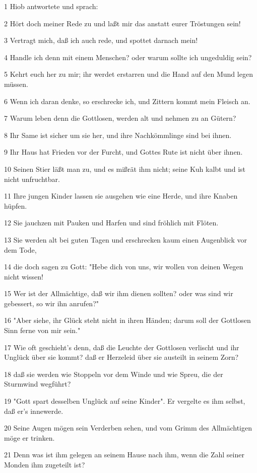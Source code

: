 \par 1 Hiob antwortete und sprach:
\par 2 Hört doch meiner Rede zu und laßt mir das anstatt eurer Tröstungen sein!
\par 3 Vertragt mich, daß ich auch rede, und spottet darnach mein!
\par 4 Handle ich denn mit einem Menschen? oder warum sollte ich ungeduldig sein?
\par 5 Kehrt euch her zu mir; ihr werdet erstarren und die Hand auf den Mund legen müssen.
\par 6 Wenn ich daran denke, so erschrecke ich, und Zittern kommt mein Fleisch an.
\par 7 Warum leben denn die Gottlosen, werden alt und nehmen zu an Gütern?
\par 8 Ihr Same ist sicher um sie her, und ihre Nachkömmlinge sind bei ihnen.
\par 9 Ihr Haus hat Frieden vor der Furcht, und Gottes Rute ist nicht über ihnen.
\par 10 Seinen Stier läßt man zu, und es mißrät ihm nicht; seine Kuh kalbt und ist nicht unfruchtbar.
\par 11 Ihre jungen Kinder lassen sie ausgehen wie eine Herde, und ihre Knaben hüpfen.
\par 12 Sie jauchzen mit Pauken und Harfen und sind fröhlich mit Flöten.
\par 13 Sie werden alt bei guten Tagen und erschrecken kaum einen Augenblick vor dem Tode,
\par 14 die doch sagen zu Gott: "Hebe dich von uns, wir wollen von deinen Wegen nicht wissen!
\par 15 Wer ist der Allmächtige, daß wir ihm dienen sollten? oder was sind wir gebessert, so wir ihn anrufen?"
\par 16 "Aber siehe, ihr Glück steht nicht in ihren Händen; darum soll der Gottlosen Sinn ferne von mir sein."
\par 17 Wie oft geschieht's denn, daß die Leuchte der Gottlosen verlischt und ihr Unglück über sie kommt? daß er Herzeleid über sie austeilt in seinem Zorn?
\par 18 daß sie werden wie Stoppeln vor dem Winde und wie Spreu, die der Sturmwind wegführt?
\par 19 "Gott spart desselben Unglück auf seine Kinder". Er vergelte es ihm selbst, daß er's innewerde.
\par 20 Seine Augen mögen sein Verderben sehen, und vom Grimm des Allmächtigen möge er trinken.
\par 21 Denn was ist ihm gelegen an seinem Hause nach ihm, wenn die Zahl seiner Monden ihm zugeteilt ist?
